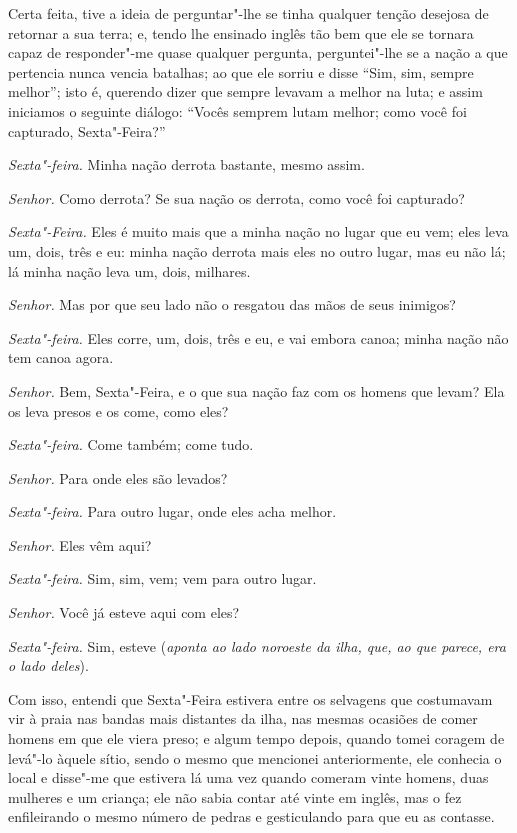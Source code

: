 Certa feita, tive a ideia de perguntar"-lhe se tinha qualquer tenção
desejosa de retornar a sua terra; e, tendo lhe ensinado inglês tão bem
que ele se tornara capaz de responder"-me quase qualquer pergunta,
perguntei"-lhe se a nação a que pertencia nunca vencia batalhas; ao que
ele sorriu e disse ``Sim, sim, sempre melhor''; isto é, querendo dizer
que sempre levavam a melhor na luta; e assim iniciamos o seguinte
diálogo: ``Vocês semprem lutam melhor; como você foi capturado,
Sexta"-Feira?''

\emph{Sexta"-feira.} Minha nação derrota bastante, mesmo assim.

\emph{Senhor.} Como derrota? Se sua nação os derrota, como você foi
capturado?

\emph{Sexta"-Feira.} Eles é muito mais que a minha nação no lugar que eu
vem; eles leva um, dois, três e eu: minha nação derrota mais eles no
outro lugar, mas eu não lá; lá minha nação leva um, dois, milhares.

\emph{Senhor.} Mas por que seu lado não o resgatou das mãos de seus
inimigos?

\emph{Sexta"-feira.} Eles corre, um, dois, três e eu, e vai embora canoa;
minha nação não tem canoa agora.

\emph{Senhor.} Bem, Sexta"-Feira, e o que sua nação faz com os homens que
levam? Ela os leva presos e os come, como eles?

\emph{Sexta"-feira.} Come também; come tudo.

\emph{Senhor.} Para onde eles são levados?

\emph{Sexta"-feira.} Para outro lugar, onde eles acha melhor.

\emph{Senhor.} Eles vêm aqui?

\emph{Sexta"-feira.} Sim, sim, vem; vem para outro lugar.

\emph{Senhor.} Você já esteve aqui com eles?

\emph{Sexta"-feira.} Sim, esteve (\emph{aponta ao lado noroeste da ilha,
que, ao que parece, era o lado deles}).

Com isso, entendi que Sexta"-Feira estivera entre os selvagens que
costumavam vir à praia nas bandas mais distantes da ilha, nas mesmas
ocasiões de comer homens em que ele viera preso; e algum tempo depois,
quando tomei coragem de levá"-lo àquele sítio, sendo o mesmo que
mencionei anteriormente, ele conhecia o local e disse"-me que estivera lá
uma vez quando comeram vinte homens, duas mulheres e um criança; ele não
sabia contar até vinte em inglês, mas o fez enfileirando o mesmo número
de pedras e gesticulando para que eu as contasse.

